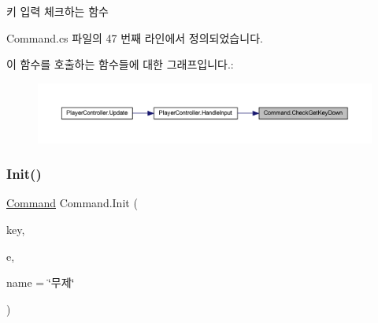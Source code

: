키 입력 체크하는 함수 



Command.\+cs 파일의 47 번째 라인에서 정의되었습니다.


\begin{DoxyCode}{0}

\end{DoxyCode}
이 함수를 호출하는 함수들에 대한 그래프입니다.\+:
\nopagebreak
\begin{figure}[H]
\begin{center}
\leavevmode
\includegraphics[width=350pt]{d5/d6a/class_command_ac35514f10fbf789814e9ce5431a26562_icgraph}
\end{center}
\end{figure}
\mbox{\label{class_command_afc8d0350d5935d74a3685f427173d62e}} 
\subsubsection{\texorpdfstring{Init()}{Init()}\hspace{0.1cm}{\footnotesize\ttfamily [1/2]}}
{\footnotesize\ttfamily \mbox{\hyperlink{class_command}{Command}} Command.\+Init (\begin{DoxyParamCaption}\item[{Key\+Code}]{key,  }\item[{\mbox{\hyperlink{class_command_acc714b5e0de57b7f24b2619fff860b9d}{Key\+Down\+Event}}}]{e,  }\item[{string}]{name = {\ttfamily \char`\"{}무제\char`\"{}} }\end{DoxyParamCaption})}



